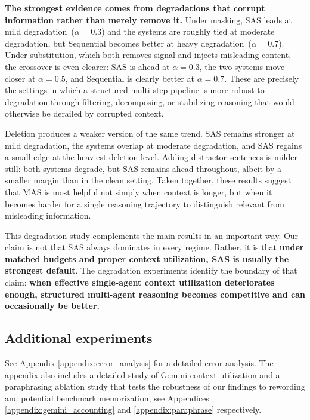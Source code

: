\documentclass{article} %
\begin{document}
\textbf{The strongest evidence comes from degradations that corrupt information rather than merely remove it.} Under masking, SAS leads at mild degradation~($\alpha=0.3$) and the systems are roughly tied at moderate degradation, but Sequential becomes better at heavy degradation~($\alpha=0.7$). Under substitution, which both removes signal and injects misleading content, the crossover is even clearer: SAS is ahead at $\alpha=0.3$, the two systems move closer at $\alpha=0.5$, and Sequential is clearly better at $\alpha=0.7$. These are precisely the settings in which a structured multi-step pipeline is more robust to degradation through filtering, decomposing, or stabilizing reasoning that would otherwise be derailed by corrupted context.

Deletion produces a weaker version of the same trend. SAS remains stronger at mild degradation, the systems overlap at moderate degradation, and SAS regains a small edge at the heaviest deletion level. Adding distractor sentences is milder still: both systems degrade, but SAS remains ahead throughout, albeit by a smaller margin than in the clean setting. Taken together, these results suggest that MAS is most helpful not simply when context is longer, but when it becomes harder for a single reasoning trajectory to distinguish relevant from misleading information.

This degradation study complements the main results in an important way. Our claim is not that SAS always dominates in every regime. Rather, it is that \textbf{under matched budgets and proper context utilization, SAS is usually the strongest default}. The degradation experiments identify the boundary of that claim: \textbf{when effective single-agent context utilization deteriorates enough, structured multi-agent reasoning becomes competitive and can occasionally be better.} %

\subsection{Additional experiments}

See Appendix \ref{appendix:error_analysis} for a detailed error analysis. The appendix also includes a detailed study of Gemini context utilization and a paraphrasing ablation study that tests the robustness of our findings to rewording and potential benchmark memorization, see Appendices \ref{appendix:gemini_accounting} and \ref{appendix:paraphrase} respectively.
\end{document}
